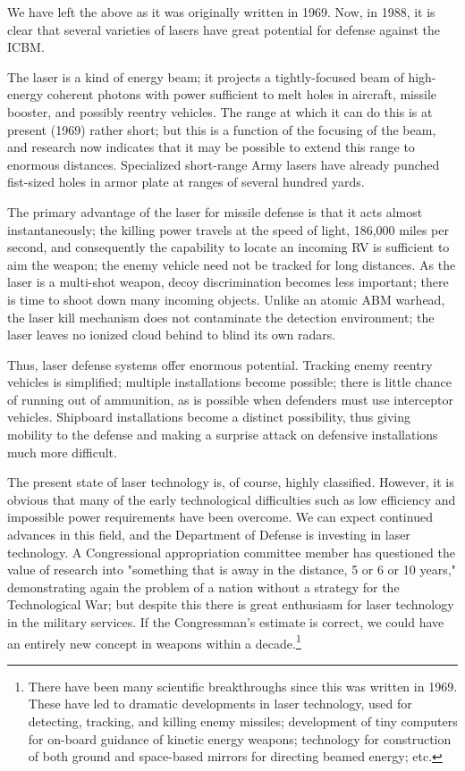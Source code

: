 \begin{mdframed}[backgroundcolor=black!10]
We have left the above as it was originally written in 1969. Now, in 1988, it is clear that several varieties of lasers have great potential for defense against the ICBM.
\end{mdframed}

The laser is a kind of energy beam; it projects a tightly-focused beam of high-energy coherent photons with power sufficient to melt holes in aircraft, missile booster, and possibly reentry vehicles. The range at which it can do this is at present (1969) rather short; but this is a function of the focusing of the beam, and research now indicates that it may be possible to extend this range to enormous distances. Specialized short-range Army lasers have already punched fist-sized holes in armor plate at ranges of several hundred yards.

The primary advantage of the laser for missile defense is that it acts almost instantaneously; the killing power travels at the speed of light, 186,000 miles per second, and consequently the capability to locate an incoming RV is sufficient to aim the weapon; the enemy vehicle need not be tracked for long distances. As the laser is a multi-shot weapon, decoy discrimination becomes less important; there is time to shoot down many incoming objects. Unlike an atomic ABM warhead, the laser kill mechanism does not contaminate the detection environment; the laser leaves no ionized cloud behind to blind its own radars.

Thus, laser defense systems offer enormous potential. Tracking enemy reentry vehicles is simplified; multiple installations become possible; there is little chance of running out of ammunition, as is possible when defenders must use interceptor vehicles. Shipboard installations become a distinct possibility, thus giving mobility to the defense and making a surprise attack on defensive installations much more difficult.

The present state of laser technology is, of course, highly classified. However, it is obvious that many of the early technological difficulties such as low efficiency and impossible power requirements have been overcome. We can expect continued advances in this field, and the Department of Defense is investing in laser technology. A Congressional appropriation committee member has questioned the value of research into "something that is away in the distance, 5 or 6 or 10 years," demonstrating again the problem of a nation without a strategy for the Technological War; but despite this there is great enthusiasm for laser technology in the military services. If the Congressman's estimate is correct, we could have an entirely new concept in weapons within a decade.\footnote{
There have been many scientific breakthroughs since this was written in 1969. These have led to dramatic developments in laser technology, used for detecting, tracking, and killing enemy missiles; development of tiny computers for on-board guidance of kinetic energy weapons; technology for construction of both ground and space-based mirrors for directing beamed energy; etc.}

